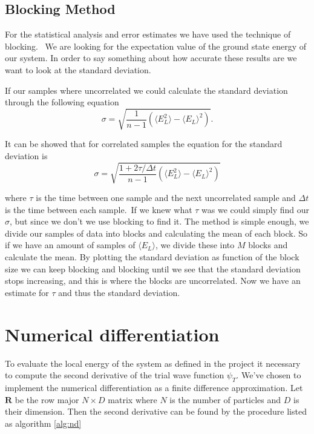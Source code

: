 \subsection{Blocking Method}

For the statistical analysis and error estimates we have used the technique of blocking. \
We are looking for the expectation value of the ground state energy of our system. In order to say something about how accurate these results are we want to look at the standard deviation. 

If our samples where uncorrelated we could calculate the standard deviation through the following equation 
$$\sigma = \sqrt{\frac{1}{n - 1} \left(\langle E_L^2\rangle - \langle E_L \rangle^2\right)}.$$

It can be showed that for correlated samples the equation for the standard deviation is
$$\sigma = \sqrt{\frac{1 + 2 \tau / \Delta t}{n - 1} \left(\langle E_L^2\rangle - \langle E_L \rangle^2\right)}$$

where $\tau$ is the time between one sample and the next uncorrelated sample and $\Delta t$ is the time between each sample.\
If we knew what $\tau$ was we could simply find our $\sigma$, but since we don't we use blocking to find it. The method is simple enough, we divide our samples of data into blocks and calculating the mean of each block. So if we have an amount of samples of $\langle E_L \rangle$, we divide these into $M$ blocks and calculate the mean. By plotting the standard deviation as function of the block size we can keep blocking and blocking until we see that the standard deviation stops increasing, and this is where the blocks are uncorrelated. Now we have an estimate for $\tau$ and thus the standard deviation.


\section{Numerical differentiation}
To evaluate the local energy of the system as defined in the project it necessary to compute the second derivative of the trial wave function $\psi_T$. We've chosen to implement the numerical differentiation as a finite difference approximation. Let $\mathbf{R}$ be the row major $N \times D$ matrix where $N$ is the number of particles and $D$ is their dimension. Then the second derivative can be found by the procedure listed as algorithm \ref{alg:nd}

